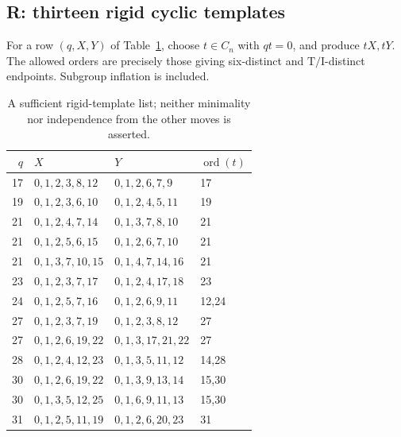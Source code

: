 \documentclass[11pt]{article}
\theoremstyle{remark}
\newcommand{\TI}{\mathrm{T/I}}
\newcommand{\ord}{\operatorname{ord}}
\begin{document}
\subsection{R: thirteen rigid cyclic templates}\label{sec:rigid}
For a row $(q,X,Y)$ of Table~\ref{tab:rigid}, choose $t\in C_n$ with
$qt=0$, and produce $tX,tY$. The allowed orders are precisely those giving
six-distinct and $\TI$-distinct endpoints. Subgroup inflation is included.
\begin{table}[htbp]
\centering\small
\begin{tabular}{rlll}
\toprule
$q$ & $X$ & $Y$ & $\ord(t)$\\
\midrule
17 & $0,1,2,3,8,12$ & $0,1,2,6,7,9$ & 17\\
19 & $0,1,2,3,6,10$ & $0,1,2,4,5,11$ & 19\\
21 & $0,1,2,4,7,14$ & $0,1,3,7,8,10$ & 21\\
21 & $0,1,2,5,6,15$ & $0,1,2,6,7,10$ & 21\\
21 & $0,1,3,7,10,15$ & $0,1,4,7,14,16$ & 21\\
23 & $0,1,2,3,7,17$ & $0,1,2,4,17,18$ & 23\\
24 & $0,1,2,5,7,16$ & $0,1,2,6,9,11$ & 12,24\\
27 & $0,1,2,3,7,19$ & $0,1,2,3,8,12$ & 27\\
27 & $0,1,2,6,19,22$ & $0,1,3,17,21,22$ & 27\\
28 & $0,1,2,4,12,23$ & $0,1,3,5,11,12$ & 14,28\\
30 & $0,1,2,6,19,22$ & $0,1,3,9,13,14$ & 15,30\\
30 & $0,1,3,5,12,25$ & $0,1,6,9,11,13$ & 15,30\\
31 & $0,1,2,5,11,19$ & $0,1,2,6,20,23$ & 31\\
\bottomrule
\end{tabular}
\caption{A sufficient rigid-template list; neither minimality nor independence
from the other moves is asserted.}\label{tab:rigid}
\end{table}
\end{document}
